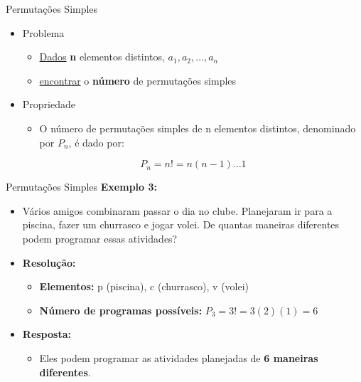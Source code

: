 \documentclass[aspectratio=169]{beamer}
\begin{document}
\begin{frame}{Permutações Simples}
    \begin{itemize}
        \item Problema
        \begin{itemize}
            \item[] \underline{Dados} \textbf{n} elementos distintos, $a_1, a_2, \ldots, a_n$
            \item[] \underline{encontrar} o \textbf{número} de permutações simples
        \end{itemize}

        \pause
        \item Propriedade
        \begin{itemize}
            \item[] O número de permutações simples de n elementos distintos, denominado por $P_n$, é dado por:
        \end{itemize}

        $$ P_n = n! = n(n-1) \ldots 1 $$
    \end{itemize}

\end{frame}

\begin{frame}{Permutações Simples}
    \textbf{Exemplo 3:}

    \vspace{3mm}

    \begin{itemize}
        \item[] Vários amigos combinaram passar o dia no clube. Planejaram ir para a piscina, fazer um churrasco e jogar volei. De quantas maneiras diferentes podem programar essas atividades?
        
        \pause 
        \item[] \textbf{Resolução:}
        
        \begin{itemize}
            \item[] \textbf{Elementos:} p (piscina), c (churrasco), v (volei)
            \item[] \textbf{Número de programas possíveis:} $P_3 = 3! = 3(2)(1) = 6$
        \end{itemize}
        
        \pause
        \item[] \textbf{Resposta:}
        \begin{itemize}
            \item[] Eles podem programar as atividades planejadas de \textbf{6 maneiras diferentes}.
        \end{itemize}
    \end{itemize}
\end{frame}
\end{document}
